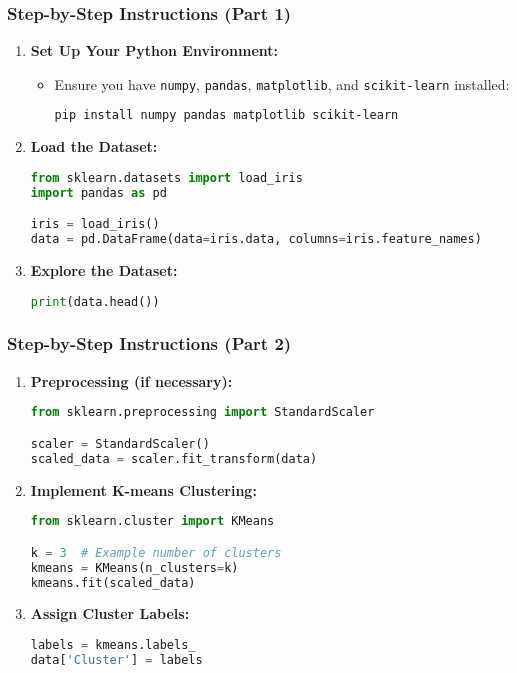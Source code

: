 \documentclass{beamer}
\begin{document}
\begin{frame}[fragile]
    \frametitle{Step-by-Step Instructions (Part 1)}
    \begin{enumerate}
        \item \textbf{Set Up Your Python Environment:}
        \begin{itemize}
            \item Ensure you have \texttt{numpy}, \texttt{pandas}, \texttt{matplotlib}, and \texttt{scikit-learn} installed:
            \begin{lstlisting}[language=bash]
pip install numpy pandas matplotlib scikit-learn
            \end{lstlisting}
        \end{itemize}
        
        \item \textbf{Load the Dataset:}
        \begin{lstlisting}[language=python]
from sklearn.datasets import load_iris
import pandas as pd

iris = load_iris()
data = pd.DataFrame(data=iris.data, columns=iris.feature_names)
        \end{lstlisting}

        \item \textbf{Explore the Dataset:}
        \begin{lstlisting}[language=python]
print(data.head())
        \end{lstlisting}
    \end{enumerate}
\end{frame}

\begin{frame}[fragile]
    \frametitle{Step-by-Step Instructions (Part 2)}
    \begin{enumerate}[resume]
        \item \textbf{Preprocessing (if necessary):}
        \begin{lstlisting}[language=python]
from sklearn.preprocessing import StandardScaler

scaler = StandardScaler()
scaled_data = scaler.fit_transform(data)
        \end{lstlisting}

        \item \textbf{Implement K-means Clustering:}
        \begin{lstlisting}[language=python]
from sklearn.cluster import KMeans

k = 3  # Example number of clusters
kmeans = KMeans(n_clusters=k)
kmeans.fit(scaled_data)
        \end{lstlisting}

        \item \textbf{Assign Cluster Labels:}
        \begin{lstlisting}[language=python]
labels = kmeans.labels_
data['Cluster'] = labels
        \end{lstlisting}
    \end{enumerate}
\end{frame}
\end{document}

